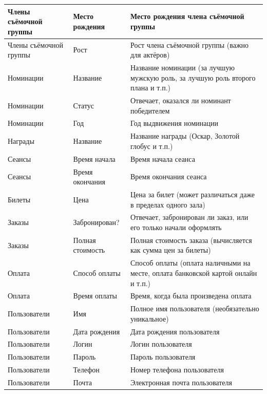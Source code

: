 \documentclass[a4paper,12pt]{article}
\renewcommand{\^}[2]{#1^{\, #2} \kern -1pt}
\newcommand{\1}{\kern 1pt}
\newcommand{\0}{\kern -1pt}
\begin{document}
	\begin{center}
		\begin{tabular}{|p{4cm}|p{4cm}|p{7cm}|}
			\hline
			Члены съёмочной группы	& Место рождения	& Место рождения члена съёмочной группы	\\ \hline
			Члены съёмочной группы	& Рост	& Рост члена съёмочной группы (важно для актёров)	\\ \hline
			Номинации	& Название	& Название номинации (за лучшую мужскую роль, за лучшую роль второго плана и т.п.)	\\ \hline
			Номинации	& Статус	& Отвечает, оказался ли номинант победителем	\\ \hline
			Номинации	& Год	& Год выдвижения номинации	\\ \hline
			Награды	& Название	& Название награды (Оскар, Золотой глобус и т.п.)	\\ \hline
			Сеансы	& Время начала	& Время начала сеанса	\\ \hline
			Сеансы	& Время окончания	& Время окончания сеанса	\\ \hline
			Билеты	& Цена	& Цена за билет (может различаться даже в пределах одного зала)	\\ \hline
			Заказы	& Забронирован?	& Отвечает, забронирован ли заказ, или его только начали оформлять	\\ \hline
			Заказы	& Полная стоимость	& Полная стоимость заказа (вычисляется как сумма цен за билеты)	\\ \hline
			Оплата	& Способ оплаты	& Способ оплаты (оплата наличными на месте, оплата банковской картой онлайн и т.п.)	\\ \hline
			Оплата	& Время оплаты	& Время, когда была произведена оплата	\\ \hline
			Пользователи	& Имя	& Полное имя пользователя (необязательно уникальное)	\\ \hline
			Пользователи	& Дата рождения	& Дата рождения пользователя	\\ \hline
			Пользователи	& Логин	& Логин пользователя	\\ \hline
			Пользователи	& Пароль	& Пароль пользователя	\\ \hline
			Пользователи	& Телефон	& Номер телефона пользователя	\\ \hline
			Пользователи	& Почта	& Электронная почта пользователя	\\ \hline
			

		\end{tabular}
	\end{center}
\end{document}
